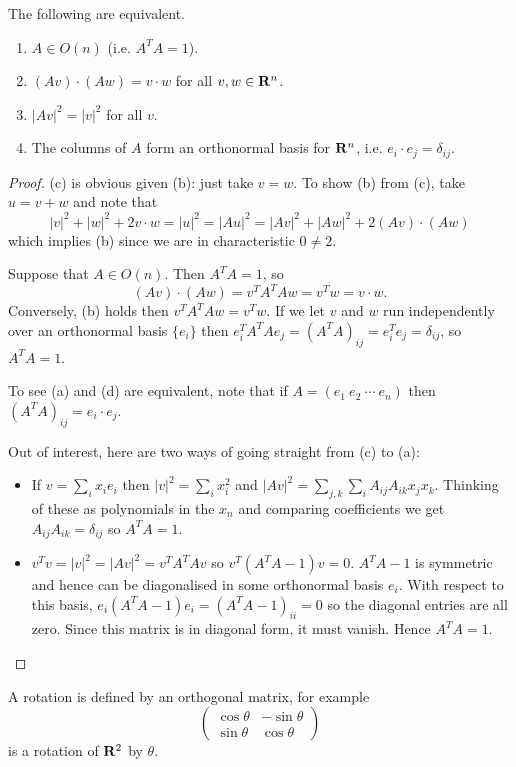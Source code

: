 \documentclass[12pt]{article}
\begin{document}
\begin{lma}
  The following are equivalent.
  \begin{enumerate}
  \item[(a)] $A\in O(n)$ (i.e. $A^TA=1$).
  \item[(b)] $(Av)\cdot(Aw)=v\cdot w$ for all $v,w\in\mathbf{R}^n$.
  \item[(c)] $|Av|^2=|v|^2$ for all $v$.
  \item[(d)] The columns of $A$ form an orthonormal basis for $\mathbf{R}^n$, i.e. $e_i\cdot e_j=\delta_{ij}$.
  \end{enumerate}
\end{lma}
\begin{proof}
  (c) is obvious given (b): just take $v=w$. To show (b) from (c), take $u=v+w$ and note that
\[|v|^2+|w|^2+2v\cdot w=|u|^2=|Au|^2=|Av|^2+|Aw|^2+2(Av)\cdot(Aw)\]
which implies (b) since we are in characteristic $0\neq 2$.

Suppose that $A\in O(n)$. Then $A^TA=1$, so
\[(Av)\cdot(Aw)=v^TA^TAw=v^Tw=v\cdot w.\]
Conversely, (b) holds then $v^TA^TAw=v^Tw$. If we let $v$ and $w$ run independently over an orthonormal basis $\{e_i\}$ then $e_i^TA^TAe_j=(A^TA)_{ij}=e_i^Te_j=\delta_{ij}$, so $A^TA=1$.

To see (a) and (d) are equivalent, note that if $A=(e_1\ e_2\ \cdots\ e_n)$ then $(A^TA)_{ij}=e_i\cdot e_j$.

Out of interest, here are two ways of going straight from (c) to (a):
\begin{itemize}
\item If $v=\sum_ix_ie_i$ then $|v|^2=\sum_ix_i^2$ and $|Av|^2=\sum_{j,k}\sum_iA_{ij}A_{ik}x_jx_k$. Thinking of these as polynomials in the $x_n$ and comparing coefficients we get $A_{ij}A_{ik}=\delta_{ij}$ so $A^TA=1$.
\item $v^Tv=|v|^2=|Av|^2=v^TA^TAv$ so $v^T(A^TA-1)v=0$. $A^TA-1$ is symmetric and hence can be diagonalised in some orthonormal basis $e_i$. With respect to this basis, $e_i(A^TA-1)e_i=(A^TA-1)_{ii}=0$ so the diagonal entries are all zero. Since this matrix is in diagonal form, it must vanish. Hence $A^TA=1$.
\end{itemize}
\end{proof}


\begin{exm}
  A rotation is defined by an orthogonal matrix, for example
  \[\left(\begin{array}{cc}
    \cos\theta & -\sin\theta\\
    \sin\theta & \cos\theta
  \end{array}\right)\]
  is a rotation of $\mathbf{R}^2$ by $\theta$.
\end{exm}
\end{document}
